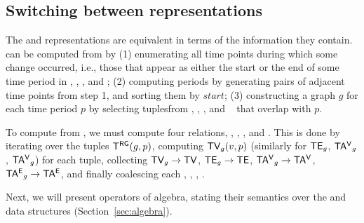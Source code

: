 \subsection{Switching between representations}  
\label{sec:model:switch}

The \trg and \tve representations are equivalent in terms of the
information they contain.  \trg can be computed from \tve by (1)
enumerating all time points during which some change occurred, i.e.,
those that appear as either the start or the end of some time period
in \tv, \te, \tav, and \tae; (2) computing \trg periods by generating
pairs of adjacent time points from step 1, and sorting them by
$start$; (3) constructing a graph $g$ for each time period $p$ by
selecting tuplesfrom \tv, \te, \tav, and \tae~ that overlap with $p$.

To compute \tve from \trg, we must compute four relations, \tv, \te,
\tav, and \tae.  This is done by iterating over the tuples $\mathsf{T^{RG}}
(g,p)$, computing $\textsf{TV}_g(v,p)$ (similarly for $\textsf{TE}_g$, $\mathsf{TA^{V}}_g$,
$\mathsf{TA^{V}}_g$) for each tuple, collecting $\textsf{TV}_g \rightarrow \textsf{TV}$, $\textsf{TE}_g
\rightarrow \textsf{TE}$, $\mathsf{TA^{V}}_g \rightarrow \mathsf{TA^{V}}$, $\mathsf{TA^{E}}_g \rightarrow
\mathsf{TA^{E}}$, and finally coalescing each \tv, \te, \tav, \tae.

Next, we will present operators of \tg algebra, stating their
semantics over the \trg and \tve data structures
(Section~\ref{sec:algebra}).  

